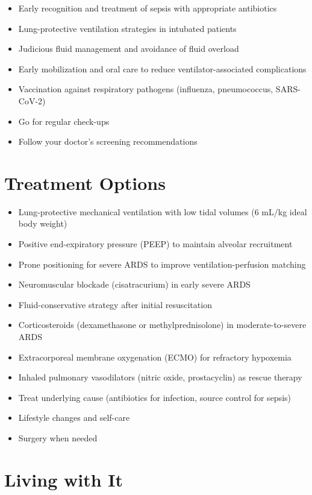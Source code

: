 \begin{itemize}[noitemsep]
  \item Early recognition and treatment of sepsis with appropriate antibiotics
  \item Lung-protective ventilation strategies in intubated patients
  \item Judicious fluid management and avoidance of fluid overload
  \item Early mobilization and oral care to reduce ventilator-associated complications
  \item Vaccination against respiratory pathogens (influenza, pneumococcus, SARS-CoV-2)
  \item Go for regular check-ups
  \item Follow your doctor's screening recommendations
\end{itemize}

\section{Treatment Options}

\begin{itemize}[noitemsep]
  \item Lung-protective mechanical ventilation with low tidal volumes (6 mL/kg ideal body weight)
  \item Positive end-expiratory pressure (PEEP) to maintain alveolar recruitment
  \item Prone positioning for severe ARDS to improve ventilation-perfusion matching
  \item Neuromuscular blockade (cisatracurium) in early severe ARDS
  \item Fluid-conservative strategy after initial resuscitation
  \item Corticosteroids (dexamethasone or methylprednisolone) in moderate-to-severe ARDS
  \item Extracorporeal membrane oxygenation (ECMO) for refractory hypoxemia
  \item Inhaled pulmonary vasodilators (nitric oxide, prostacyclin) as rescue therapy
  \item Treat underlying cause (antibiotics for infection, source control for sepsis)
  \item Lifestyle changes and self-care
  \item Surgery when needed
\end{itemize}

\section{Living with It}

